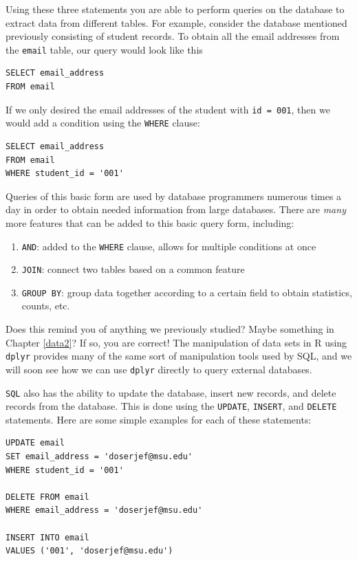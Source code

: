 \documentclass[]{krantz}
\providecommand{\tightlist}{%
  \setlength{\itemsep}{0pt}\setlength{\parskip}{0pt}}
\begin{document}
Using these three statements you are able to perform queries on the
database to extract data from different tables. For example, consider
the database mentioned previously consisting of student records. To
obtain all the email addresses from the \texttt{email} table, our query
would look like this

\begin{verbatim}
SELECT email_address
FROM email
\end{verbatim}

If we only desired the email addresses of the student with
\texttt{id\ =\ 001}, then we would add a condition using the
\texttt{WHERE} clause:

\begin{verbatim}
SELECT email_address
FROM email
WHERE student_id = '001'
\end{verbatim}

Queries of this basic form are used by database programmers numerous
times a day in order to obtain needed information from large databases.
There are \emph{many} more features that can be added to this basic
query form, including:

\begin{enumerate}
\def\labelenumi{\arabic{enumi}.}
\tightlist
\item
  \texttt{AND}: added to the \texttt{WHERE} clause, allows for multiple
  conditions at once
\item
  \texttt{JOIN}: connect two tables based on a common feature
\item
  \texttt{GROUP\ BY}: group data together according to a certain field
  to obtain statistics, counts, etc.
\end{enumerate}

Does this remind you of anything we previously studied? Maybe something
in Chapter \ref{data2}? If so, you are correct! The manipulation of data
sets in R using \texttt{dplyr} provides many of the same sort of
manipulation tools used by SQL, and we will soon see how we can use
\texttt{dplyr} directly to query external databases.

\texttt{SQL} also has the ability to update the database, insert new
records, and delete records from the database. This is done using the
\texttt{UPDATE}, \texttt{INSERT}, and \texttt{DELETE} statements. Here
are some simple examples for each of these statements:

\begin{verbatim}
UPDATE email
SET email_address = 'doserjef@msu.edu'
WHERE student_id = '001'

DELETE FROM email
WHERE email_address = 'doserjef@msu.edu'

INSERT INTO email
VALUES ('001', 'doserjef@msu.edu')
\end{verbatim}
\end{document}
